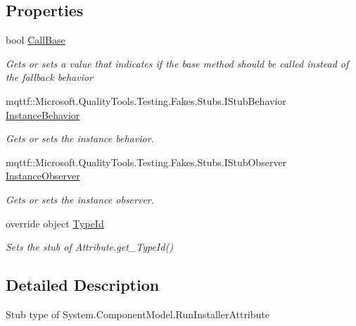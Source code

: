\subsection*{Properties}
\begin{DoxyCompactItemize}
\item 
bool \hyperlink{class_system_1_1_component_model_1_1_fakes_1_1_stub_run_installer_attribute_a0c0fd076c13f0fd3af3998456cf20c0a}{Call\-Base}
\begin{DoxyCompactList}\small\item\em Gets or sets a value that indicates if the base method should be called instead of the fallback behavior\end{DoxyCompactList}\item 
mqttf\-::\-Microsoft.\-Quality\-Tools.\-Testing.\-Fakes.\-Stubs.\-I\-Stub\-Behavior \hyperlink{class_system_1_1_component_model_1_1_fakes_1_1_stub_run_installer_attribute_af3317c253fce5e90a1d146be6fedf15c}{Instance\-Behavior}
\begin{DoxyCompactList}\small\item\em Gets or sets the instance behavior.\end{DoxyCompactList}\item 
mqttf\-::\-Microsoft.\-Quality\-Tools.\-Testing.\-Fakes.\-Stubs.\-I\-Stub\-Observer \hyperlink{class_system_1_1_component_model_1_1_fakes_1_1_stub_run_installer_attribute_a6c416666f27e9a0e6ad36c99a49f266a}{Instance\-Observer}
\begin{DoxyCompactList}\small\item\em Gets or sets the instance observer.\end{DoxyCompactList}\item 
override object \hyperlink{class_system_1_1_component_model_1_1_fakes_1_1_stub_run_installer_attribute_ad628fcba0a2feee5c1875c7fe01aded8}{Type\-Id}
\begin{DoxyCompactList}\small\item\em Sets the stub of Attribute.\-get\-\_\-\-Type\-Id()\end{DoxyCompactList}\end{DoxyCompactItemize}


\subsection{Detailed Description}
Stub type of System.\-Component\-Model.\-Run\-Installer\-Attribute



